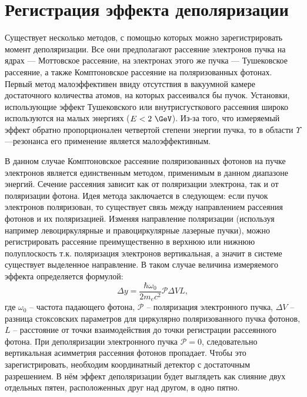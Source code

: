 \section{Регистрация эффекта деполяризации}
Существует несколько методов, с помощью которых можно зарегистрировать момент деполяризации. Все они предполагают рассеяние электронов пучка на ядрах --- Моттовское рассеяние, на электронах этого же пучка --- Тушековское рассеяние, а также Комптоновское рассеяние на поляризованных фотонах. Первый метод малоэффективен ввиду отсутствия в вакуумной камере достаточного количества атомов, на которых рассеивался бы пучок. Установки, использующие эффект Тушековского или внутрисгусткового рассеяния широко используются на малых энергиях ($E < 2~\GeV$). Из-за того, что измеряемый эффект обратно пропорционален четвертой степени энергии пучка, то в области $\Upsilon$---резонанса его применение является малоэффективным.
\par В данном случае Комптоновское рассеяние поляризованных фотонов на пучке электронов является единственным методом, применимым в данном диапазоне энергий. Сечение рассеяния зависит как от поляризации электрона, так и от поляризации фотона. Идея метода заключается в следующем: если пучок электронов поляризован, то существует связь между направлением рассеяния фотонов и их поляризацией. Изменяя направление поляризации (используя например левоциркулярные и правоциркулярные лазерные пучки), можно регистрировать рассеяние преимущественно в верхнюю или нижнюю полуплоскость т.к. поляризация электронов вертикальная, а значит в системе существует выделенное направление. В таком случае величина измеряемого эффекта определяется формулой:
\begin{equation}
	\Delta y = \frac{\hbar \omega_0}{2 m_e c^2} \mathcal{P} \Delta V L,
\end{equation}
где $\omega_0$ -- частота падающего фотона, $\mathcal{P}$ -- поляризация электронного пучка, $\Delta V$ -- разница стоксовских параметров для циркулярно поляризованного пучка фотонов, $L$ -- расстояние от точки взаимодействия до точки регистрации рассеянного фотона. При деполяризации электронного пучка $\mathcal{P} = 0$, следовательно вертикальная асимметрия рассеяния фотонов пропадает. Чтобы это зарегистрировать, необходим координатный детектор с достаточным разрешением. В нём эффект деполяризации будет выглядеть как слияние двух отдельных пятен, расположенных друг над другом, в одно пятно. 

